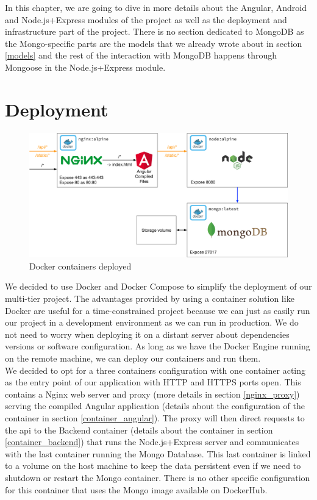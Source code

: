 \documentclass[twoside, openright,11pt,a4paper]{book}
\begin{document}
In this chapter, we are going to dive in more details about the Angular, Android and Node.js+Express modules of the project as well as the deployment and infrastructure part of the project. There is no section dedicated to MongoDB as the Mongo-specific parts are the models that we already wrote about in section \ref{models} and the rest of the interaction with MongoDB happens through Mongoose in the Node.js+Express module.
\section{Deployment}
\begin{figure}[H]
\begin{center}
	\includegraphics[width=\textwidth]{assets/deployment}
	\caption{Docker containers deployed}
	\label{docker_figu}
\end{center}
\end{figure}
We decided to use Docker and Docker Compose to simplify the deployment of our multi-tier project. The advantages provided by using a container solution like Docker are useful for a time-constrained project because we can just as easily run our project in a development environment as we can run in production. We do not need to worry when deploying it on a distant server about dependencies versions or software configuration. As long as we have the Docker Engine running on the remote machine, we can deploy our containers and run them. \\

We decided to opt for a three containers configuration with one container acting as the entry point of our application with HTTP and HTTPS ports open. This contains a Nginx web server and proxy (more details in section \ref{nginx_proxy}) serving the compiled Angular application (details about the configuration of the container in section \ref{container_angular}). The proxy will then direct requests to the \gls{api} to the Backend container (details about the container in section \ref{container_backend}) that runs the Node.js+Express server and communicates with the last container running the Mongo Database. This last container is linked to a volume on the host machine to keep the data persistent even if we need to shutdown or restart the Mongo container. There is no other specific configuration for this container that uses the Mongo image available on DockerHub\cite{docker:hub:mongo}. \\
\end{document}
